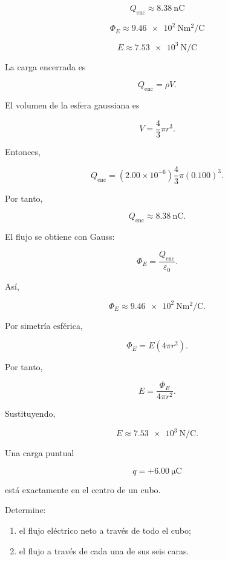 \begin{respuesta}

\[
\boxed{Q_{\text{enc}}\approx\SI{8.38}{\nano\coulomb}}
\]

\[
\boxed{
\Phi_E\approx
\SI{9.46e2}{\newton\metre\squared\per\coulomb}
}
\]

\[
\boxed{E\approx\SI{7.53e3}{\newton\per\coulomb}}
\]

\end{respuesta}

\begin{explicacion}

La carga encerrada es

\[
Q_{\text{enc}}=\rho V.
\]

El volumen de la esfera gaussiana es

\[
V=\frac43\pi r^3.
\]

Entonces,

\[
Q_{\text{enc}}
=(2.00\times10^{-6})
\frac43\pi(0.100)^3.
\]

Por tanto,

\[
\boxed{Q_{\text{enc}}\approx\SI{8.38}{\nano\coulomb}}.
\]

El flujo se obtiene con Gauss:

\[
\Phi_E=\frac{Q_{\text{enc}}}{\varepsilon_0}.
\]

Así,

\[
\boxed{
\Phi_E\approx
\SI{9.46e2}{\newton\metre\squared\per\coulomb}
}.
\]

Por simetría esférica,

\[
\Phi_E=E(4\pi r^2).
\]

Por tanto,

\[
E=\frac{\Phi_E}{4\pi r^2}.
\]

Sustituyendo,

\[
\boxed{E\approx\SI{7.53e3}{\newton\per\coulomb}}.
\]

\end{explicacion}


\begin{ejercicio}

Una carga puntual

\[
q=+\SI{6.00}{\micro\coulomb}
\]

está exactamente en el centro de un cubo.

Determine:

\begin{enumerate}
    \item el flujo eléctrico neto a través de todo el cubo;
    \item el flujo a través de cada una de sus seis caras.
\end{enumerate}

\end{ejercicio}

